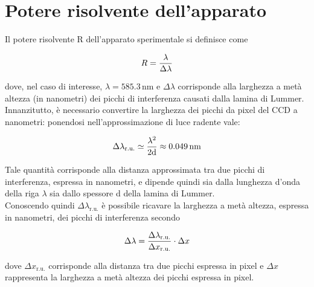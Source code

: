 \documentclass[twocolumn,10pt]{asme2ej}
\begin{document}
\vspace{-10pt}
\section{Potere risolvente dell'apparato}\label{s:risolvente}

Il potere risolvente R dell'apparato sperimentale si definisce come

\vspace{-15pt}
\begin{equation}
    R = \frac{\lambda}{\Delta\lambda}
    \label{e:r}
\vspace{-8pt}
\end{equation}

dove, nel caso di interesse, $\lambda = 585.3 \,\si{\nano\metre}$ e $\Delta\lambda$ corrisponde alla larghezza a metà
altezza (in nanometri) dei picchi di interferenza causati dalla lamina di Lummer. Innanzitutto, è necessario convertire
la larghezza dei picchi da pixel del CCD a nanometri: ponendosi nell'approssimazione di luce radente vale:

\vspace{-15pt}
\begin{equation}
    \Delta\lambda_{\text{r.u.}} \simeq \frac{\lambda^2}{2\text{d}} \approx 0.049\,\si{\nano\metre}
    \label{e:dlambdaru}
\vspace{-5pt}
\end{equation}

Tale quantità corrisponde alla distanza approssimata tra due picchi di interferenza, espressa in nanometri, e dipende
quindi sia dalla lunghezza d'onda della riga $\lambda$ sia dallo spessore d della lamina di Lummer.\\
Conoscendo quindi $\Delta\lambda_{\text{r.u.}}$ è possibile ricavare la larghezza a metà altezza, espressa in nanometri,
dei picchi di interferenza secondo

\vspace{-15pt}
\begin{equation}
    \Delta\lambda = \frac{\Delta\lambda_{\text{r.u.}}}{\Delta x_{\text{r.u.}}} \cdot \Delta x
    \label{e:dlambda}
\vspace{-5pt}
\end{equation}

dove $\Delta x_{\text{r.u.}}$ corrisponde alla distanza tra due picchi espressa in pixel e $\Delta x$ rappresenta la
larghezza a metà altezza dei picchi espressa in pixel.  
\end{document}

